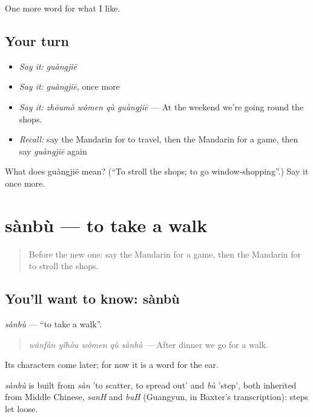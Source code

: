 \begin{grammarlens}[title={What you've built}]
One more word for what I like.
\end{grammarlens}

\subsection*{Your turn}
\begin{itemize}
\raggedright
  \item \emph{Say it:} \emph{guàngjiē}
  \item \emph{Say it:} \emph{guàngjiē}, once more
  \item \emph{Say it:} \emph{zhōumò wǒmen qù guàngjiē} — At the weekend we're going round the shops.
  \item \emph{Recall:} say the Mandarin for to travel, then the Mandarin for a game, then say \emph{guàngjiē} again
\end{itemize}

\begin{tcolorbox}[breakable,colback=teal!4,colframe=teal!35!black,title={Before you move on}]
What does guàngjiē mean? (\textquotedblleft{}To stroll the shops; to go window-shopping\textquotedblright{}.) Say it once more.
\end{tcolorbox}
\section[sànbù]{sànbù — to take a walk}

\label{lesson:ZH-C141-sanbu}



\begin{quote}
Before the new one: say the Mandarin for a game, then the Mandarin for to stroll the shops.
\end{quote}

\subsection*{You'll want to know: sànbù}
\emph{sànbù} — \textquotedblleft{}to take a walk\textquotedblright{}.

\begin{quote}
\emph{wǎnfàn yǐhòu wǒmen qù sànbù} — After dinner we go for a walk.
\end{quote}

Its characters come later; for now it is a word for the ear.

\begin{cousinweb}
\emph{sànbù} is built from \emph{sàn} 'to scatter, to spread out' and \emph{bù} 'step', both inherited from Middle Chinese, \emph{sanH} and \emph{buH} (Guangyun, in Baxter's transcription): steps let loose.
\end{cousinweb}

